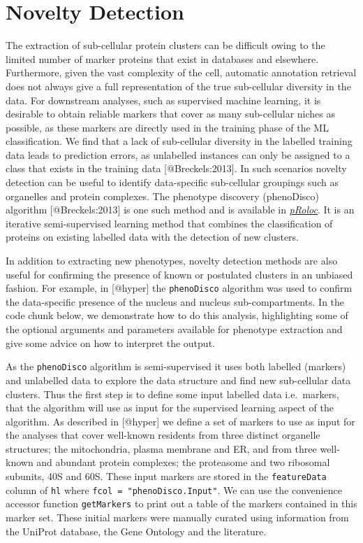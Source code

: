 \section{Novelty Detection}\label{novelty-detection}

The extraction of sub-cellular protein clusters can be difficult owing
to the limited number of marker proteins that exist in databases and
elsewhere. Furthermore, given the vast complexity of the cell, automatic
annotation retrieval does not always give a full representation of the
true sub-cellular diversity in the data. For downstream analyses, such
as supervised machine learning, it is desirable to obtain reliable
markers that cover as many sub-cellular niches as possible, as these
markers are directly used in the training phase of the ML
classification. We find that a lack of sub-cellular diversity in the
labelled training data leads to prediction errors, as unlabelled
instances can only be assigned to a class that exists in the training
data {[}@Breckels:2013{]}. In such scenarios novelty detection can be
useful to identify data-specific sub-cellular groupings such as
organelles and protein complexes. The phenotype discovery (phenoDisco)
algorithm {[}@Breckels:2013{]} is one such method and is available in
\emph{\href{http://bioconductor.org/packages/pRoloc}{pRoloc}}. It is an
iterative semi-supervised learning method that combines the
classification of proteins on existing labelled data with the detection
of new clusters.

In addition to extracting new phenotypes, novelty detection methods are
also useful for confirming the presence of known or postulated clusters
in an unbiased fashion. For example, in {[}@hyper{]} the
\texttt{phenoDisco} algorithm was used to confirm the data-specific
presence of the nucleus and nucleus sub-compartments. In the code chunk
below, we demonstrate how to do this analysis, highlighting some of the
optional arguments and parameters available for phenotype extraction and
give some advice on how to interpret the output.

As the \texttt{phenoDisco} algorithm is semi-supervised it uses both
labelled (markers) and unlabelled data to explore the data structure and
find new sub-cellular data clusters. Thus the first step is to define
some input labelled data i.e.~markers, that the algorithm will use as
input for the supervised learning aspect of the algorithm. As described
in {[}@hyper{]} we define a set of markers to use as input for the
analyses that cover well-known residents from three distinct organelle
structures; the mitochondria, plasma membrane and ER, and from three
well-known and abundant protein complexes; the proteasome and two
ribosomal subunits, 40S and 60S. These input markers are stored in the
\texttt{featureData} column of \texttt{hl} where
\texttt{fcol = "phenoDisco.Input"}. We can use the convenience accessor
function \texttt{getMarkers} to print out a table of the markers
contained in this marker set. These initial markers were manually
curated using information from the UniProt database, the Gene Ontology
and the literature.

